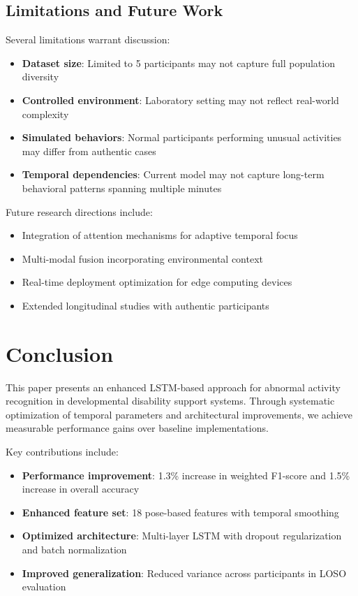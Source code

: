 \documentclass[a4paper,11pt]{article}
\begin{document}
\subsection{Limitations and Future Work}

Several limitations warrant discussion:

\begin{itemize}
\item \textbf{Dataset size}: Limited to 5 participants may not capture full population diversity
\item \textbf{Controlled environment}: Laboratory setting may not reflect real-world complexity
\item \textbf{Simulated behaviors}: Normal participants performing unusual activities may differ from authentic cases
\item \textbf{Temporal dependencies}: Current model may not capture long-term behavioral patterns spanning multiple minutes
\end{itemize}

Future research directions include:
\begin{itemize}
\item Integration of attention mechanisms for adaptive temporal focus
\item Multi-modal fusion incorporating environmental context
\item Real-time deployment optimization for edge computing devices
\item Extended longitudinal studies with authentic participants
\end{itemize}

\section{Conclusion}

This paper presents an enhanced LSTM-based approach for abnormal activity recognition in developmental disability support systems. Through systematic optimization of temporal parameters and architectural improvements, we achieve measurable performance gains over baseline implementations.

Key contributions include:
\begin{itemize}
\item \textcolor{improvement}{\textbf{Performance improvement}}: 1.3\% increase in weighted F1-score and 1.5\% increase in overall accuracy
\item \textbf{Enhanced feature set}: 18 pose-based features with temporal smoothing
\item \textbf{Optimized architecture}: Multi-layer LSTM with dropout regularization and batch normalization
\item \textbf{Improved generalization}: Reduced variance across participants in LOSO evaluation
\end{itemize}
\end{document}
